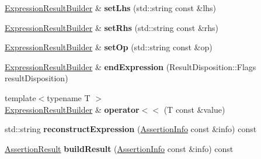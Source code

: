 \begin{DoxyCompactItemize}
\item 
\hypertarget{class_catch_1_1_expression_result_builder_a6b823ff8af8c2601fc605a1417cc9bf3}{\hyperlink{class_catch_1_1_expression_result_builder}{Expression\-Result\-Builder} \& {\bfseries set\-Lhs} (std\-::string const \&lhs)}\label{class_catch_1_1_expression_result_builder_a6b823ff8af8c2601fc605a1417cc9bf3}

\item 
\hypertarget{class_catch_1_1_expression_result_builder_a02d809bdc1f5b1bd02134ca3a7e16d19}{\hyperlink{class_catch_1_1_expression_result_builder}{Expression\-Result\-Builder} \& {\bfseries set\-Rhs} (std\-::string const \&rhs)}\label{class_catch_1_1_expression_result_builder_a02d809bdc1f5b1bd02134ca3a7e16d19}

\item 
\hypertarget{class_catch_1_1_expression_result_builder_ab935419ef69e035c9a9917e0c141f12b}{\hyperlink{class_catch_1_1_expression_result_builder}{Expression\-Result\-Builder} \& {\bfseries set\-Op} (std\-::string const \&op)}\label{class_catch_1_1_expression_result_builder_ab935419ef69e035c9a9917e0c141f12b}

\item 
\hypertarget{class_catch_1_1_expression_result_builder_a7d559e496cbbf9c6f86ddd0fa2a79bdc}{\hyperlink{class_catch_1_1_expression_result_builder}{Expression\-Result\-Builder} \& {\bfseries end\-Expression} (Result\-Disposition\-::\-Flags result\-Disposition)}\label{class_catch_1_1_expression_result_builder_a7d559e496cbbf9c6f86ddd0fa2a79bdc}

\item 
\hypertarget{class_catch_1_1_expression_result_builder_ab1e905653cb3a012f0cb21984d0707b2}{{\footnotesize template$<$typename T $>$ }\\\hyperlink{class_catch_1_1_expression_result_builder}{Expression\-Result\-Builder} \& {\bfseries operator$<$$<$} (T const \&value)}\label{class_catch_1_1_expression_result_builder_ab1e905653cb3a012f0cb21984d0707b2}

\item 
\hypertarget{class_catch_1_1_expression_result_builder_a93074d7f2ee025b2da03b98b3aecc7dc}{std\-::string {\bfseries reconstruct\-Expression} (\hyperlink{struct_catch_1_1_assertion_info}{Assertion\-Info} const \&info) const }\label{class_catch_1_1_expression_result_builder_a93074d7f2ee025b2da03b98b3aecc7dc}

\item 
\hypertarget{class_catch_1_1_expression_result_builder_a6ed45d798de11a19d3316bb6b8f854d8}{\hyperlink{class_catch_1_1_assertion_result}{Assertion\-Result} {\bfseries build\-Result} (\hyperlink{struct_catch_1_1_assertion_info}{Assertion\-Info} const \&info) const }\label{class_catch_1_1_expression_result_builder_a6ed45d798de11a19d3316bb6b8f854d8}


\end{DoxyCompactItemize}
